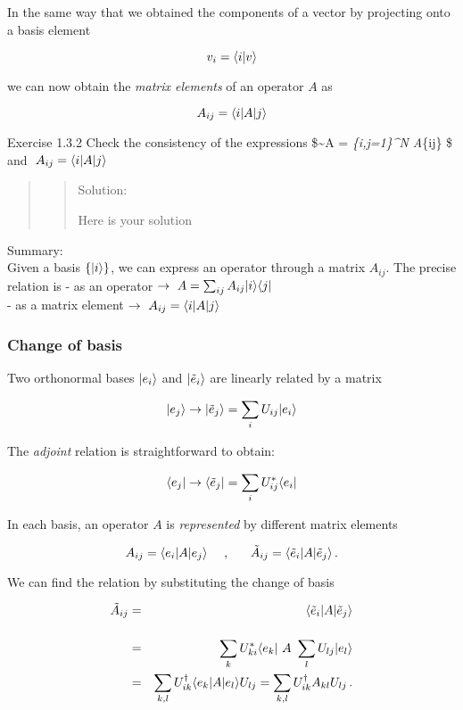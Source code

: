 \documentclass[11pt]{article}
\begin{document}
In the same way that we obtained the components of a vector by
projecting onto a basis element

\[
v_i = \langle i|v\rangle
\]

we can now obtain the \emph{matrix elements} of an operator \(A\) as

\[
A_{ij} = \langle i| A |j\rangle
\]

    Exercise 1.3.2 Check the consistency of the expressions
\$\textasciitilde A = \sum\emph{\{i,j=1\}\^{}N A}\{ij\}  \$
and \(~A_{ij} = \langle i| A |j\rangle\)

\begin{quote}
\begin{quote}
Solution:

Here is your solution
\end{quote}
\end{quote}

    Summary: \\
Given a basis \(\{|i\rangle\}\), we can express an operator through a
matrix \(A_{ij}\). The precise relation is - as an operator
\(\to ~ A = \sum_{ij} A_{ij} | i\rangle \langle j|\) \\
- as a matrix element \(\to ~ A_{ij} = \langle i| A |j\rangle\)

    \subsubsection{Change of basis}\label{change-of-basis}

Two orthonormal bases \(|e_i\rangle\) and \(|\tilde e_i\rangle\) are
linearly related by a matrix

\[
|e_j\rangle \to |\tilde e_j\rangle = \sum_{i} U_{ij} |e_i\rangle
\]

The \emph{adjoint} relation is straightforward to obtain:

\[
\langle e_j| \to \langle \tilde e_j| = \sum_i U^*_{ij} \langle e_i|
\]

    In each basis, an operator \(A\) is \emph{represented} by different
matrix elements

\[
A_{ij} = \langle e_i| A |e_j\rangle ~~~~,~~~~~ \tilde{A}_{ij} = \langle \tilde{e}_i| A |\tilde{e}_j\rangle \, .
\]

    We can find the relation by substituting the change of basis

\begin{eqnarray}
\tilde A_{ij} &=& \bra{\tilde e_i} A \ket{\tilde e_j} \\ \rule{0mm}{8mm}
&=& \sum_{k}U^*_{ki}\bra{e_k} ~A~ \sum_l U_{lj}\ket{e_l} \\ 
&=&  \sum_{k,l} U^\dagger_{ik}\bra{e_k} A  \ket{e_l}U_{lj}   = \sum_{k,l} U^\dagger_{ik}A_{kl} U_{lj} \, .
\end{eqnarray}
\end{document}
